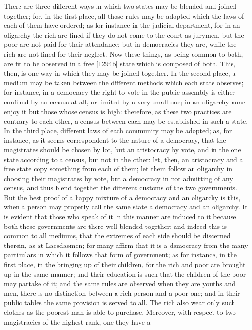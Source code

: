 There are three different ways in which two states may be blended and
joined together; for, in the first place, all those rules may be adopted
which the laws of each of them have ordered; as for instance in the
judicial department, for in an oligarchy the rich are fined if they do not
come to the court as jurymen, but the poor are not paid for their
attendance; but in democracies they are, while the rich are not fined for
their neglect. Now these things, as being common to both, are fit to be
observed in a free [1294b] state which is composed of both. This, then, is
one way in which they may be joined together. In the second place, a
medium may be taken between the different methods which each state
observes; for instance, in a democracy the right to vote in the public
assembly is either confined by no census at all, or limited by a very
small one; in an oligarchy none enjoy it but those whose census is high:
therefore, as these two practices are contrary to each other, a census
between each may be established in such a state. In the third place,
different laws of each community may be adopted; as, for instance, as it
seems correspondent to the nature of a democracy, that the magistrates
should be chosen by lot, but an aristocracy by vote, and in the one state
according to a census, but not in the other: let, then, an aristocracy and
a free state copy something from each of them; let them follow an
oligarchy in choosing their magistrates by vote, but a democracy in not
admitting of any census, and thus blend together the different customs of
the two governments. But the best proof of a happy mixture of a democracy
and an oligarchy is this, when a person may properly call the same state a
democracy and an oligarchy. It is evident that those who speak of it in
this manner are induced to it because both these governments are there
well blended together: and indeed this is common to all mediums, that the
extremes of each side should be discerned therein, as at Lacedaemon; for
many affirm that it is a democracy from the many particulars in which it
follows that form of government; as for instance, in the first place, in
the bringing up of their children, for the rich and poor are brought up in
the same manner; and their education is such that the children of the poor
may partake of it; and the same rules are observed when they are youths
and men, there is no distinction between a rich person and a poor one; and
in their public tables the same provision is served to all. The rich also
wear only such clothes as the poorest man is able to purchase. Moreover,
with respect to two magistracies of the highest rank, one they have a

